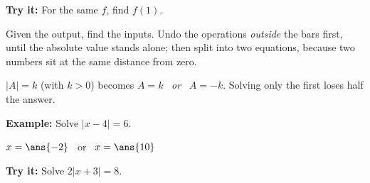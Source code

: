 \documentclass[12pt]{article}
\begin{document}
\begin{tryitbox}
\textbf{Try it:} \quad For the same $f$, find $f(1)$.\\[2pt]
\end{tryitbox}


\begin{formulabox}
Given the output, find the inputs. Undo the operations \emph{outside} the bars first, until the absolute value stands alone; then split into two equations, because two numbers sit at the same distance from zero.\par\smallskip
$|A| = k$ (with $k > 0$) becomes $A = k$ \ \emph{or} \ $A = -k$. Solving only the first loses half the answer.
\end{formulabox}

\begin{examplebox}
\textbf{Example:} \quad Solve $|x-4| = 6$.
\par
$x = \ans{-2}$ \ or \ $x = \ans{10}$
\end{examplebox}

\begin{tryitbox}
\textbf{Try it:} \quad Solve $2|x+3| = 8$.\\[2pt]
\end{tryitbox}
\end{document}
